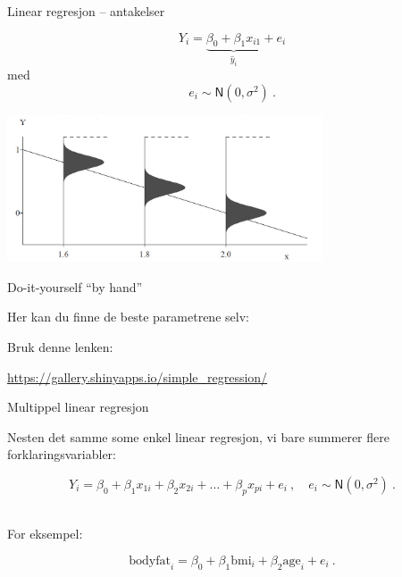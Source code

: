 \documentclass[10pt,ignorenonframetext,]{beamer}
\begin{document}
\begin{frame}{Linear regresjon -- antakelser}
\protect\hypertarget{linear-regresjon-antakelser}{}

\[Y_i = \underbrace{\beta_0 + \beta_1 x_{i1}}_{\hat{y}_i} + e_i\] med
\[e_i \sim \textsf{N}(0,\sigma^2) \ .\]

\centering

\includegraphics[width=0.7\textwidth,height=\textheight]{regrAssumptions.jpg}

\end{frame}

\begin{frame}

\begin{block}{Do-it-yourself ``by hand''}

\vspace{6mm}

Her kan du finne de beste parametrene selv: \vspace{2mm}

Bruk denne lenken: \vspace{2mm}

\url{https://gallery.shinyapps.io/simple_regression/}

\end{block}

\end{frame}

\begin{frame}{Multippel linear regresjon}
\protect\hypertarget{multippel-linear-regresjon}{}

Nesten det samme some enkel linear regresjon, vi bare summerer flere
forklaringsvariabler:

\[Y_i = \beta_0 + \beta_1 x_{1i} + \beta_2 x_{2i} + \ldots + \beta_p x_{pi} + e_i \ , \quad e_i \sim\mathsf{N}(0,\sigma^2) \ .\]
\(~\)

For eksempel:

\[\text{bodyfat}_i = \beta_0 + \beta_1 \text{bmi}_i + \beta_2 \text{age}_i + e_i \ .\]

\end{frame}
\end{document}
